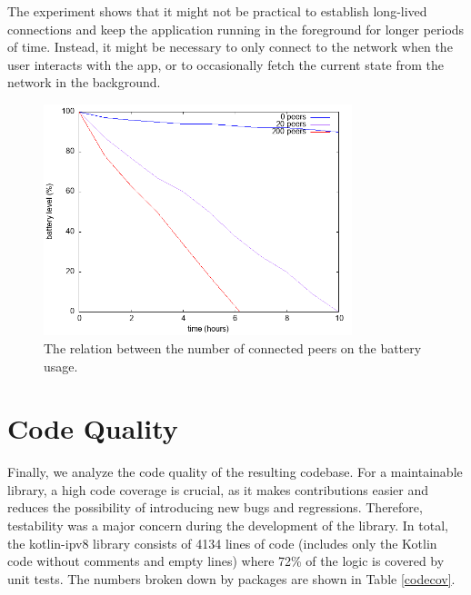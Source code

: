 The experiment shows that it might not be practical to establish long-lived connections and keep the application running in the foreground for longer periods of time. Instead, it might be necessary to only connect to the network when the user interacts with the app, or to occasionally fetch the current state from the network in the background.

\begin{figure}[h!]
    \centering
    \includegraphics[width=0.8\textwidth]{plots/battery}
    \caption{The relation between the number of connected peers on the battery usage.}
    \label{battery}
\end{figure}

\section{Code Quality}

Finally, we analyze the code quality of the resulting codebase. For a maintainable library, a high code coverage is crucial, as it makes contributions easier and reduces the possibility of introducing new bugs and regressions. Therefore, testability was a major concern during the development of the library. In total, the kotlin-ipv8 library consists of 4134 lines of code (includes only the Kotlin code without comments and empty lines) where 72\% of the logic is covered by unit tests. The numbers broken down by packages are shown in Table \ref{codecov}.

